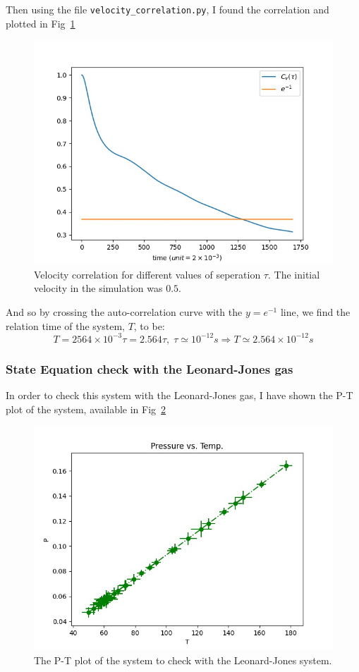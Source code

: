 \documentclass[12pt, a4paper]{article}
\begin{document}
	Then using the file \texttt{velocity\_correlation.py}, I found the correlation and plotted in 
	Fig~\ref{fig:velocity_correlation}
	
	\begin{figure}[h!]
		\centering
		\includegraphics[width=.9\linewidth]{../results/velocity_correlation.jpg}
		\caption{Velocity correlation for different values of seperation $\tau$. The initial velocity in the simulation was 
			$0.5$.}
		\label{fig:velocity_correlation}
	\end{figure}
	
	And so by crossing the auto-correlation curve with the $y = e^{-1}$ line, we find the relation time of the 
	system, $T$, to be:
	\begin{equation}
		T = 2564 \times 10^{-3} \tau = 2.564 \tau, \; \tau \simeq 10^{-12} s \Rightarrow T \simeq 2.564 \times 
		10^{-12} s
	\end{equation}
	
	\subsubsection{State Equation check with the Leonard-Jones gas}
	In order to check this system with the Leonard-Jones gas, I have shown the P-T plot of the system, available in Fig~\ref{fig:P-T}
	\begin{figure}[h!]
		\centering
		\includegraphics[width=0.9\linewidth]{../results/pressure_temp.jpg}
		\caption{The P-T plot of the system to check with the Leonard-Jones system.}
		\label{fig:P-T}
	\end{figure}
	
\end{document}
